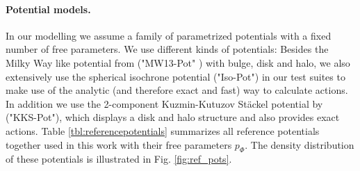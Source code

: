 \paragraph{Potential models.} In our modelling we assume a family of parametrized potentials with a fixed number of free parameters. We use different kinds of potentials: Besides the Milky Way like potential from \citet{bov13} ("MW13-Pot" ) with bulge, disk and halo, we also extensively use the spherical isochrone potential ("Iso-Pot") in our test suites to make use of the analytic (and therefore exact and fast) way  to calculate actions. In addition we use the 2-component Kuzmin-Kutuzov St\"{a}ckel potential by \citet{bat94} ("KKS-Pot"), which displays a disk and halo structure and also provides exact actions. Table \ref{tbl:referencepotentials} summarizes all reference potentials together used in this work with their free parameters $p_\Phi$. The density distribution of these potentials is illustrated in Fig. \ref{fig:ref_pots}.


